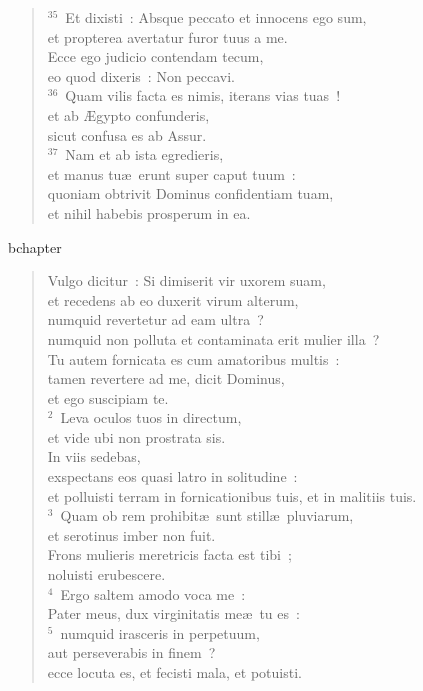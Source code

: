 \begin{verse}
${}^{35}$~Et dixisti~: Absque peccato et innocens ego sum,\\ et propterea avertatur furor tuus a me.\\ Ecce ego judicio contendam tecum,\\ eo quod dixeris~: Non peccavi.\\
${}^{36}$~Quam vilis facta es nimis, iterans vias tuas~!\\ et ab \AE gypto confunderis,\\ sicut confusa es ab Assur.\\
${}^{37}$~Nam et ab ista egredieris,\\ et manus tu\ae\ erunt super caput tuum~:\\ quoniam obtrivit Dominus confidentiam tuam,\\ et nihil habebis prosperum in ea.\end{verse}


bchapter\begin{verse}\vspace{-19pt}Vulgo dicitur~: Si dimiserit vir uxorem suam,\\ et recedens ab eo duxerit virum alterum,\\ numquid revertetur ad eam ultra~?\\ numquid non polluta et contaminata erit mulier illa~?\\ Tu autem fornicata es cum amatoribus multis~:\\ tamen revertere ad me, dicit Dominus,\\ et ego suscipiam te.\\
${}^{2}$~Leva oculos tuos in directum,\\ et vide ubi non prostrata sis.\\ In viis sedebas,\\ exspectans eos quasi latro in solitudine~:\\ et polluisti terram in fornicationibus tuis, et in malitiis tuis.\\
${}^{3}$~Quam ob rem prohibit\ae\ sunt still\ae\ pluviarum,\\ et serotinus imber non fuit.\\ Frons mulieris meretricis facta est tibi~;\\ noluisti erubescere.\\
${}^{4}$~Ergo saltem amodo voca me~:\\ Pater meus, dux virginitatis me\ae\ tu es~:\\
${}^{5}$~numquid irasceris in perpetuum,\\ aut perseverabis in finem~?\\ ecce locuta es, et fecisti mala, et potuisti.\end{verse}


